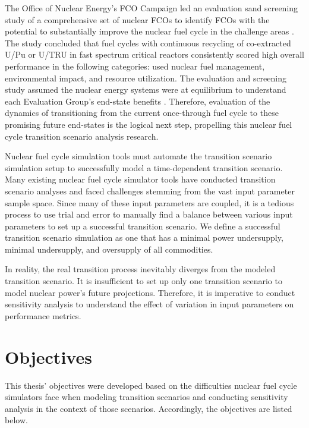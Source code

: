 The Office of Nuclear Energy's
\gls{FCO} Campaign led an evaluation 
sand screening study of a comprehensive set of nuclear \glspl{FCO} 
to identify \glspl{FCO} with the potential to substantially 
improve the nuclear fuel cycle in the challenge areas
\cite{wigeland_nuclear_2014}. 
The study concluded that fuel cycles with continuous recycling
of co-extracted U/Pu or U/TRU in fast spectrum critical reactors
consistently scored high overall performance in the following 
categories: used nuclear fuel management, environmental impact, 
and resource utilization. 
The evaluation and screening study assumed
the nuclear energy systems were at equilibrium to understand 
each Evaluation Group's
end-state benefits \cite{feng_standardized_2016}. 
Therefore, evaluation of the dynamics of transitioning from the current 
once-through fuel cycle to these promising 
future end-states \cite{feng_standardized_2016} 
is the logical next step, propelling this
nuclear fuel cycle transition scenario analysis research. 

Nuclear fuel cycle simulation tools must automate the transition scenario simulation 
setup to successfully model a time-dependent transition scenario. 
Many existing nuclear fuel cycle simulator tools have conducted 
transition scenario analyses 
\cite{feng_standardized_2016,bae_standardized_2019,coquelet-pascal_cosi6:_2015}
and faced challenges stemming from the vast input parameter
sample space.
Since many of these input parameters are coupled, it is 
a tedious process to use trial and error to manually find a balance 
between various input parameters to set up a successful transition 
scenario. 
We define a successful transition scenario simulation as one that 
has a minimal power undersupply, minimal undersupply, 
and oversupply of all commodities. 
 
In reality, the real transition process inevitably diverges
from the modeled transition scenario. 
It is insufficient to set up only one transition scenario to model 
nuclear power's future projections.
Therefore, it is imperative to conduct sensitivity analysis to understand 
the effect of variation in input parameters on 
performance metrics. 

\section{Objectives}
This thesis' objectives were developed based on the difficulties 
nuclear fuel cycle simulators face when modeling transition scenarios 
and conducting sensitivity analysis in the context of those scenarios.
Accordingly, the objectives are listed below. 

